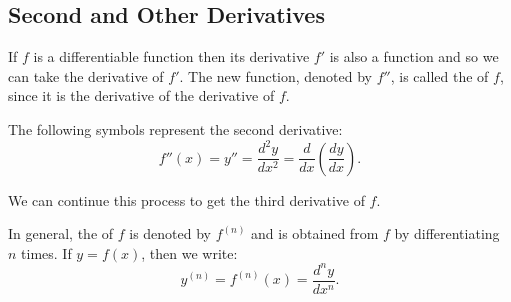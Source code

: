 \subsection{Second and Other Derivatives}
If $f$ is a differentiable function then its derivative $f'$ is also a function and so we can take the derivative of $f'$.
The new function, denoted by $f''$, is called the  of $f$, since it is the derivative of the derivative of $f$.

The following symbols represent the second derivative:
$$f''(x)=y''=\frac{d^2y}{dx^2}=\frac{d}{dx}\left(\frac{dy}{dx}\right).$$

We can continue this process to get the third derivative of $f$.

In general, the  of $f$ is denoted by $f^{(n)}$ and is obtained from $f$ by differentiating $n$ times.
If $y=f(x)$, then we write:
$$y^{(n)}=f^{(n)}(x)=\frac{d^ny}{dx^n}.$$
